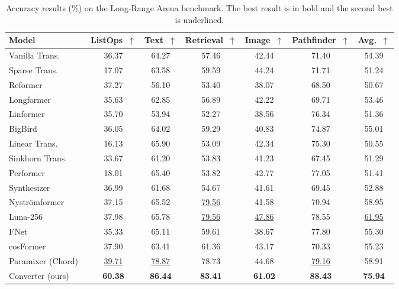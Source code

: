 \begin{table*}[!ht]
\centering
\caption{Accuracy results (\%) on the Long-Range Arena benchmark. The best result is in bold and the second best is underlined.}
\label{tab:lra_res}
\begin{tabular}{lcccccc}
\toprule
\textbf{Model} & \textbf{ListOps}~$\uparrow$ & \textbf{Text}~$\uparrow$ & \textbf{Retrieval}~$\uparrow$ & \textbf{Image}~$\uparrow$ & \textbf{Pathfinder}~$\uparrow$ & \textbf{Avg.}~$\uparrow$ \\
\midrule
Vanilla Trans.~\citep{NIPS2017_3f5ee243} & 36.37 & 64.27 & 57.46 & 42.44 & 71.40 & 54.39 \\
Sparse Trans.~\citep{child2019generating} & 17.07 & 63.58 & 59.59 & 44.24 & 71.71 & 51.24 \\
Reformer~\citep{Kitaev2020Reformer} & 37.27 & 56.10 & 53.40 & 38.07 & 68.50 & 50.67 \\
Longformer~\citep{beltagy2020longformer} & 35.63 & 62.85 & 56.89 & 42.22 & 69.71 & 53.46 \\
Linformer~\citep{wang2020linformer} & 35.70 & 53.94 & 52.27 & 38.56 & 76.34 & 51.36 \\
BigBird~\citep{NEURIPS2020_c8512d14} & 36.05 & 64.02 & 59.29 & 40.83 & 74.87 & 55.01 \\
Linear Trans.~\citep{pmlr-v119-katharopoulos20a} & 16.13 & 65.90 & 53.09 & 42.34 & 75.30 & 50.55 \\
Sinkhorn Trans.~\citep{pmlr-v119-tay20a} & 33.67 & 61.20 & 53.83 & 41.23 & 67.45 & 51.29 \\
Performer~\citep{choromanski2021rethinking} & 18.01 & 65.40 & 53.82 & 42.77 & 77.05 & 51.41 \\
Synthesizer~\citep{pmlr-v139-tay21a} & 36.99 & 61.68 & 54.67 & 41.61 & 69.45 & 52.88 \\
Nystr{\"{o}}mformer~\citep{xiong2021Nystromformer} & 37.15 & 65.52 & \underline{79.56} & 41.58 & 70.94 & 58.95 \\
Luna-256~\citep{ma2021luna} & 37.98 & 65.78 & \underline{79.56} & \underline{47.86} & 78.55 & \underline{61.95} \\
FNet~\citep{lee-thorp-etal-2022-fnet} & 35.33 & 65.11 & 59.61 & 38.67 & 77.80  & 55.30 \\
cosFormer~\citep{zhen2022cosformer} & 37.90 & 63.41 & 61.36 & 43.17 & 70.33 & 55.23 \\
Paramixer (Chord)~\citep{9878955} & \underline{39.71} & \underline{78.87} & 78.73 & 44.68 & \underline{79.16} & 58.91 \\
\midrule
Converter (ours) & \textbf{60.38} & \textbf{86.44} & \textbf{83.41} & \textbf{61.02} & \textbf{88.43} & \textbf{75.94} \\
\bottomrule
\end{tabular}
\end{table*}

